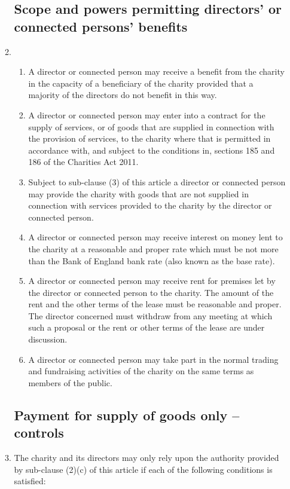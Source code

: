 \documentclass{article}
\begin{document}
\begin{enumerate}[label=\arabic*]
\begin{enumerate}[label=(\arabic*)]
        \subsection{Scope and powers permitting directors’ or connected persons’ benefits}
        \item \begin{enumerate}[label=(\alph*)]
            \item A director or connected person may receive a benefit from
            the charity in the capacity of a beneficiary of the charity
            provided that a majority of the directors do not benefit in
            this way.
            \item A director or connected person may enter into a contract
            for the supply of services, or of goods that are supplied in
            connection with the provision of services, to the charity
            where that is permitted in accordance with, and subject
            to the conditions in, sections 185 and 186 of the Charities
            Act 2011.
            \item Subject to sub-clause (3) of this article a director or
            connected person may provide the charity with goods
            that are not supplied in connection with services provided
            to the charity by the director or connected person.
            \item A director or connected person may receive interest on
            money lent to the charity at a reasonable and proper rate
            which must be not more than the Bank of England bank
            rate (also known as the base rate).
            \item A director or connected person may receive rent for
            premises let by the director or connected person to the
            charity. The amount of the rent and the other terms of
            the lease must be reasonable and proper. The director
            concerned must withdraw from any meeting at which
            such a proposal or the rent or other terms of the lease are
            under discussion.
            \item A director or connected person may take part in the
            normal trading and fundraising activities of the charity on
            the same terms as members of the public.
        \end{enumerate}
        
        \subsection{Payment for supply of goods only – controls}
        \item The charity and its directors may only rely upon the authority
        provided by sub-clause (2)(c) of this article if each of the
        following conditions is satisfied:
        

\end{enumerate}
\end{enumerate}
\end{document}

